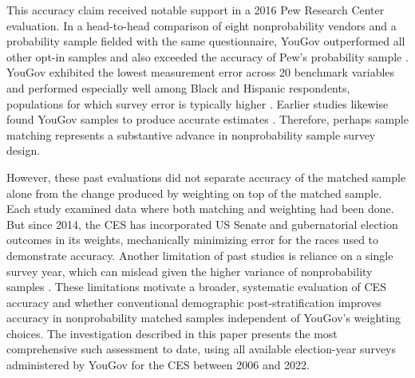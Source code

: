 \documentclass[12pt]{article}
\begin{document}
This accuracy claim received notable support in a 2016 Pew Research Center evaluation. In a head-to-head comparison of eight nonprobability vendors and a probability sample fielded with the same questionnaire, YouGov outperformed all other opt-in samples and also exceeded the accuracy of Pew’s probability sample \parencite{kennedy_evaluating_2016}. YouGov exhibited the lowest measurement error across 20 benchmark variables and performed especially well among Black and Hispanic respondents, populations for which survey error is typically higher \parencite{hopkins_getting_2024}. Earlier studies likewise found YouGov samples to produce accurate estimates \parencite{vavreck_2006_2008, rivers_inference_2009, ansolabehere_cooperative_2013, ansolabehere_does_2014}. Therefore, perhaps sample matching represents a substantive advance in nonprobability sample survey design.

However, these past evaluations did not separate accuracy of the matched sample alone from the change produced by weighting on top of the matched sample. Each study examined data where both matching and weighting had been done. But since 2014, the CES has incorporated US Senate and gubernatorial election outcomes in its weights, mechanically minimizing error for the races used to demonstrate accuracy. Another limitation of past studies is reliance on a single survey year, which can mislead given the higher variance of nonprobability samples \parencite{macinnis_accuracy_2018}. These limitations motivate a broader, systematic evaluation of CES accuracy and whether conventional demographic post-stratification improves accuracy in nonprobability matched samples independent of YouGov's weighting choices. The investigation described in this paper presents the most comprehensive such assessment to date, using all available election-year surveys administered by YouGov for the CES between 2006 and 2022.


\end{document}
